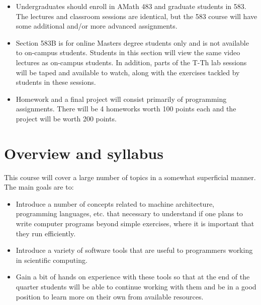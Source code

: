 \documentclass[letterpaper,10pt,english]{sphinxmanual}
\begin{document}
\begin{itemize}
\item {} 
Undergraduates should enroll in AMath 483 and graduate students in 583. The
lectures and classroom sessions are identical, but the 583 course will have
some additional and/or more advanced assignments.

\item {} 
Section 583B is for online Masters degree students only and is not
available to on-campus students. Students in this section will view the same
video lectures as on-campus students. In addition, parts of the T-Th
lab sessions will be taped and available to watch, along with the
exercises tackled by students in these sessions.

\item {} 
Homework and a final project will consist primarily of programming
assignments.   There will be 4 homeworks worth 100 points each and
the project will be worth 200 points.

\end{itemize}


\section{Overview and syllabus}
\label{outline::doc}\label{outline:outline}\label{outline:overview-and-syllabus}
This course will cover a large number of topics in a somewhat superficial
manner.  The main goals are to:
\begin{itemize}
\item {} 
Introduce a number of concepts related to machine architecture,
programming languages, etc. that necessary to understand if one plans to
write computer programs beyond simple exercises, where it is important
that they run efficiently.

\item {} 
Introduce a variety of software tools that are useful to programmers
working in scientific computing.

\item {} 
Gain a bit of hands on experience with these tools so that at the end
of the quarter students will be able to continue working with them and
be in a good position to learn more on their own from available
resources.

\end{itemize}
\end{document}
